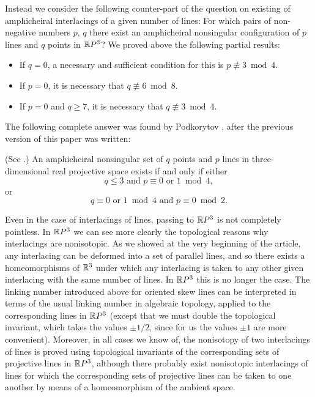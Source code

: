 \documentclass{article}
\begin{document}
Instead we consider the following counter-part of the question on
existing of amphicheiral interlacings of a given number of lines:
For which pairs of non-negative numbers $p$, $q$ there exist an
amphicheiral nonsingular configuration of $p$ lines and $q$ points in
$\mathbb{R} P^3$?  We proved above the following partial results:
\begin{itemize}
\item If $q=0$, a necessary and sufficient
condition for this is $p\not\equiv3\bmod4$. 
\item If $p=0$,  it is necessary that $q\not\equiv6\bmod8$.
\item If $p=0$ and $q\ge7$, it is necessary that $q\not\equiv3\bmod4$.
\end{itemize}
The following complete answer was found by Podkorytov \cite{Pod}, 
after the previous version \cite{2} of this paper was written:

\begin{Th} (See \cite{Pod}.) An amphicheiral 
nonsingular set 
of $q$ points and $p$ lines in three-dimensional real projective space
exists if and only if either 
$$q\le 3 \text{  and } p\equiv0\text{ or }1\bmod4, $$
or
$$q\equiv0 \text{ or }1\bmod4 \text{ and }p\equiv0\bmod2. $$
\end{Th}




Even in the case of interlacings of lines, passing to $\mathbb{R} P^3$ is not
completely pointless. In $\mathbb{R} P^3$ we can see more clearly the topological
reasons why  interlacings are nonisotopic. As we showed at the very beginning
of the article, any interlacing can be deformed into a set of parallel lines,
and so there exists a homeomorphisms of $\mathbb{R}^3$ under which any interlacing
is taken to any other given interlacing with the same number of lines. In
$\mathbb{R} P^3$ this is no longer the case. The linking number introduced
above for oriented skew lines can be interpreted in terms of the usual linking
number in algebraic topology, applied to the corresponding lines in 
$\mathbb{R} P^3$ (except that we must double the topological invariant, which takes the
values $\pm1/2$, since for us the values $\pm1$ are more convenient). Moreover,
in all cases we know of, the nonisotopy of two interlacings of lines is proved
using topological invariants of the corresponding sets of projective lines in
$\mathbb{R} P^3$, although there probably exist nonisotopic interlacings of lines
for which the corresponding sets of projective lines can be taken to one
another by means of a homeomorphism of the ambient space.
\end{document}
